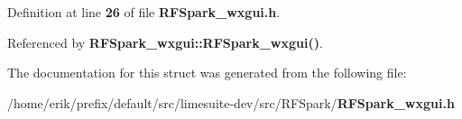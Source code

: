 Definition at line {\bf 26} of file {\bf R\+F\+Spark\+\_\+wxgui.\+h}.



Referenced by {\bf R\+F\+Spark\+\_\+wxgui\+::\+R\+F\+Spark\+\_\+wxgui()}.



The documentation for this struct was generated from the following file\+:\begin{DoxyCompactItemize}
\item 
/home/erik/prefix/default/src/limesuite-\/dev/src/\+R\+F\+Spark/{\bf R\+F\+Spark\+\_\+wxgui.\+h}\end{DoxyCompactItemize}
